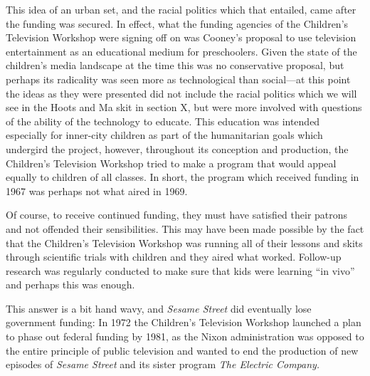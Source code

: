 \documentclass[12pt,letterpaper]{article}
\newcommand{\ses}{\textit{Sesame Street }}
\begin{document}
	This idea of an urban set, and the racial politics which that 
	entailed, came after the funding was secured. In effect, what the 
	funding agencies of the Children’s Television Workshop were signing off
	on was Cooney’s proposal to use television entertainment as an 
	educational medium for preschoolers. Given the state of the children’s 
	media landscape at the time \autocite[chapters 1, 3, and 4]{Davis} this 
	was no conservative proposal, but perhaps its radicality was seen more 
	as technological than social---at this point the ideas as they were 
	presented did not include the racial politics which we will see in 
	the Hoots and Ma skit in section X, but were more involved with 
	questions of the ability of the technology to educate. This education 
	was intended 
	especially for inner-city children as part of the humanitarian goals 
	which undergird the project, however, throughout its conception and 
	production, the Children's Television Workshop tried to make a program 
	that would appeal equally to children of all classes. In short, the 
	program which received funding in 1967 was perhaps not what aired in 
	1969.

	Of course, to receive continued funding, they must have satisfied their 
	patrons and not offended their sensibilities. This may have been made 
	possible by the fact that the Children's Television Workshop  was
	running all of their lessons and skits through scientific trials with 
	children and they aired what worked. Follow-up research was regularly 
	conducted to make sure that kids were learning ``in 
	vivo''\autocite[118]{Davis} and perhaps	this was enough.

	This answer is a bit hand wavy, and \ses did eventually lose government
	funding: In 1972 the Children's Television Workshop launched a plan to 
	phase out federal funding by 1981, as the Nixon administration was 
	opposed to the entire principle of public television and wanted to end 
	the production of new episodes of \ses and its sister program
	\textit{The Electric Company.}\autocite[218]{Davis} 
\end{document}
